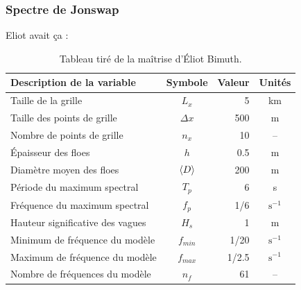 \documentclass[10pt]{article}
\numberwithin{equation}{section}
\begin{document}
\subsubsection{Spectre de Jonswap}
\label{sec:org970aafa}

Eliot avait ça : 

\begin{table}[!h]
\caption{\label{tab:org698965d}Tableau tiré de la maîtrise d'Éliot Bimuth.}
\centering
\begin{tabular}{lcrc}
\hline
\hline
Description de la variable & Symbole & Valeur & Unités\\
\hline
Taille de la grille & \(L_x\) & 5 & km\\
Taille des points de grille & \(\Delta x\) & 500 & m\\
Nombre de points de grille & \(n_x\) & 10 & --\\
Épaisseur des floes & \(h\) & 0.5 & m\\
Diamètre moyen des floes & \(\expval{D}\) & 200 & m\\
Période du maximum spectral & \(T_p\) & 6 & s\\
Fréquence du maximum spectral & \(f_p\) & 1/6 & \(\mathrm{s}^{-1}\)\\
Hauteur significative des vagues & \(H_s\) & 1 & m\\
Minimum de fréquence du modèle & \(f_{min}\) & 1/20 & \(\mathrm{s}^{-1}\)\\
Maximum de fréquence du modèle & \(f_{max}\) & 1/2.5 & \(\mathrm{s}^{-1}\)\\
Nombre de fréquences du modèle & \(n_f\) & 61 & --\\
\hline
\end{tabular}
\end{table}
\end{document}
